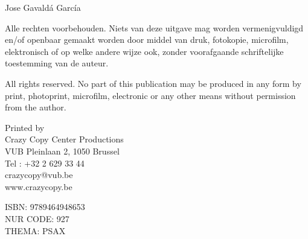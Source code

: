 \vspace*{\fill}

\noindent \textcopyright Jose Gavaldá García

\vspace{1em}
\noindent Alle rechten voorbehouden. Niets van deze uitgave mag worden vermenigvuldigd en/of openbaar gemaakt worden door middel van druk, fotokopie, microfilm, elektronisch of op welke andere wijze ook, zonder voorafgaande schriftelijke toestemming van de auteur.

\vspace{1em}
\noindent All rights reserved. No part of this publication may be produced in any form by print, photoprint, microfilm, electronic or any other means without permission from the author.

\vspace{1em}
\noindent Printed by\\
Crazy Copy Center Productions\\
VUB  Pleinlaan 2, 1050 Brussel\\
Tel : +32 2 629 33 44\\
crazycopy@vub.be\\
www.crazycopy.be

\vspace{1em}
\noindent ISBN: 9789464948653\\
NUR CODE: 927	\\
THEMA: PSAX
